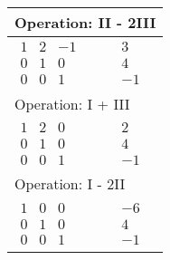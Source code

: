 \begin{longtable}{p{4cm}|p{3cm}}
    \multicolumn{2}{p{\dimexpr4cm+3cm+2\tabcolsep\relax}}{Operation: II - 2III} \\\hline\pagebreak[0]

    $\displaystyle\begin{matrix}
        1 & 2 & -1 \\
        0 & 1 & 0 \\
        0 & 0 & 1
    \end{matrix}$&
    $\displaystyle\begin{matrix}
        3 \\ 4 \\ -1
    \end{matrix}$\\\hline

    \multicolumn{2}{p{\dimexpr4cm+3cm+2\tabcolsep\relax}}{Operation: I + III} \\\hline\pagebreak[0]

    $\displaystyle\begin{matrix}
        1 & 2 & 0 \\
        0 & 1 & 0 \\
        0 & 0 & 1
    \end{matrix}$&
    $\displaystyle\begin{matrix}
        2 \\ 4 \\ -1
    \end{matrix}$\\\hline

    \multicolumn{2}{p{\dimexpr4cm+3cm+2\tabcolsep\relax}}{Operation: I - 2II} \\\hline\pagebreak[0]

    $\displaystyle\begin{matrix}
        1 & 0 & 0 \\
        0 & 1 & 0 \\
        0 & 0 & 1
    \end{matrix}$&
    $\displaystyle\begin{matrix}
        -6 \\ 4 \\ -1
    \end{matrix}$\\\hline
\end{longtable}

